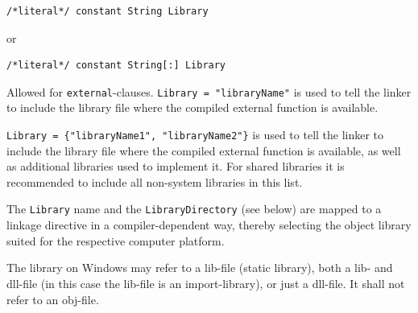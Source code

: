 \begin{annotationdefinition}[Library]
\begin{synopsis}
\begin{lstlisting}
/*literal*/ constant String Library
\end{lstlisting}
or
\begin{lstlisting}
/*literal*/ constant String[:] Library
\end{lstlisting}
\end{synopsis}
\begin{semantics}
Allowed for {\lstinline!external!}-clauses.
{\lstinline!Library = "libraryName"!} is used to tell the linker to include the library file where the compiled external function is available.

{\lstinline!Library = {"libraryName1", "libraryName2"}!} is used to tell the linker to include the library file where the compiled external function is available, as well as additional libraries used to implement it.
For shared libraries it is recommended to include all non-system libraries in this list.

The {\lstinline!Library!} name and the {\lstinline!LibraryDirectory!} (see below) are mapped to a linkage directive in a compiler-dependent way, thereby selecting the object library suited for the respective computer platform.

The library on Windows may refer to a lib-file (static library), both a lib- and dll-file (in this case the lib-file is an import-library), or just a dll-file.
It shall not refer to an obj-file.
\end{semantics}
\end{annotationdefinition}

